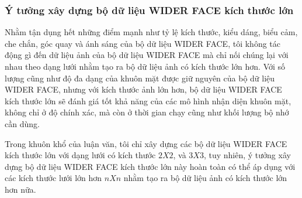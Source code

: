 {    \subsubsection*{Ý tưởng xây dựng bộ dữ liệu WIDER FACE kích thước lớn}
    Nhằm tận dụng hết những điểm mạnh như tỷ lệ kích thước, kiểu dáng, biểu cảm, che chắn, góc quay và ánh sáng của bộ dữ liệu WIDER FACE, tôi không tác động gì đến dữ liệu ảnh của bộ dữ liệu WIDER FACE mà chỉ nối chúng lại với nhau theo dạng lưới nhằm tạo ra bộ dữ liệu ảnh có kích thước lớn hơn.
    Với số lượng cũng như độ đa dạng của khuôn mặt được giữ nguyên của bộ dữ liệu WIDER FACE, nhưng với kích thước ảnh lớn hơn, bộ dữ liệu WIDER FACE kích thước lớn sẽ đánh giá tốt khả năng của các mô hình nhận diện khuôn mặt, không chỉ ở độ chính xác, mà còn ở thời gian chạy cũng như khối lượng bộ nhớ cần dùng.

    \noindent
    Trong khuôn khổ của luận văn, tôi chỉ xây dựng các bộ dữ liệu WIDER FACE kích thước lớn với dạng lưới có kích thước $2 X 2$, và $3 X 3$, tuy nhiên, ý tưởng xây dựng bộ dữ liệu WIDER FACE kích thước lớn này hoàn toàn có thể áp dụng với các kích thước lưới lớn hơn $n X n$ nhằm tạo ra bộ dữ liệu ảnh có kích thước lớn hơn nữa.

}

